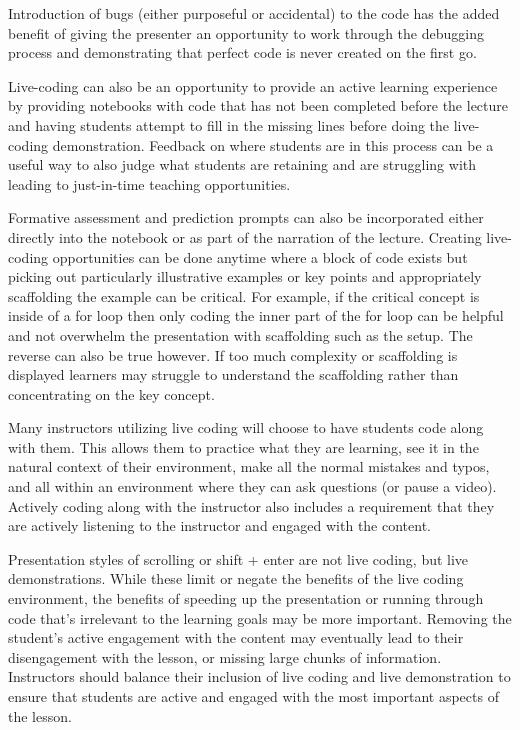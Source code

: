 \documentclass[]{book}
\begin{document}
Introduction of bugs (either purposeful or accidental) to the code has the added
benefit of giving the presenter an opportunity to work through the debugging
process and demonstrating that perfect code is never created on the first go.

Live-coding can also be an opportunity to provide an active learning experience
by providing notebooks with code that has not been completed before the lecture
and having students attempt to fill in the missing lines before doing the
live-coding demonstration. Feedback on where students are in this process can
be a useful way to also judge what students are retaining and are struggling
with leading to just-in-time teaching opportunities.

Formative assessment and prediction prompts can also be incorporated either
directly into the notebook or as part of the narration of the lecture. Creating
live-coding opportunities can be done anytime where a block of code exists but
picking out particularly illustrative examples or key points and appropriately
scaffolding the example can be critical. For example, if the critical concept
is inside of a for loop then only coding the inner part of the for loop can be
helpful and not overwhelm the presentation with scaffolding such as the setup.
The reverse can also be true however. If too much complexity or
scaffolding is displayed learners may struggle to understand the scaffolding
rather than concentrating on the key concept.

Many instructors utilizing live coding will choose to have students code along
with them. This allows them to practice what they are learning, see it in the
natural context of their environment, make all the normal mistakes and typos,
and all within an environment where they can ask questions (or pause a video).
Actively coding along with the instructor also includes a requirement that they
are actively listening to the instructor and engaged with the content.

Presentation styles of scrolling or shift + enter are not live coding, but
live demonstrations. While these limit or negate the benefits of the live
coding environment, the benefits of speeding up the presentation or running
through code that's irrelevant to the learning goals may be more important.
Removing the student's active engagement with the content may eventually lead to
their disengagement with the lesson, or missing large chunks of information.
Instructors should balance their inclusion of live coding and live demonstration
to ensure that students are active and engaged with the most important aspects
of the lesson.
\end{document}
